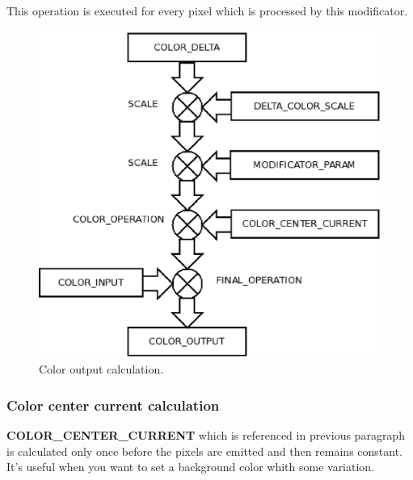 \documentclass[9pt]{article}
\begin{document}
This operation is executed for every pixel which is processed by 
this modificator.

\begin{figure}[h]
\begin{center}
  \includegraphics[scale=0.6]{p09.eps}
  \caption{Color output calculation.}
  \label{color_output_calculation}
\end{center}
\end{figure}

\subsubsection*{Color center current calculation}

{\bf COLOR\_CENTER\_CURRENT} which is referenced in previous paragraph is 
calculated only once before the pixels are emitted and then remains constant. 
It's useful when you want to set a background color whith some
variation.
\end{document}
